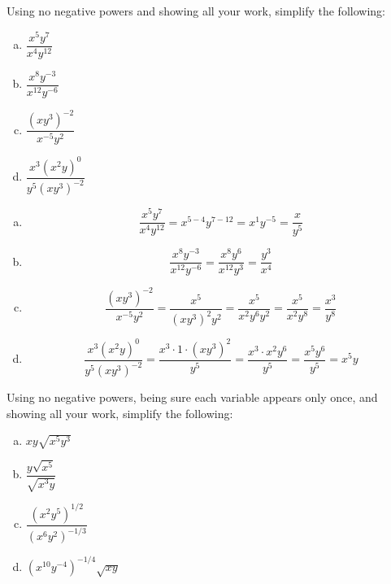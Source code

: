 \documentclass[11pt,letterpaper]{article}
\begin{document}
\newpage



 Using no negative powers and showing all your work, simplify the following:
        \begin{enumerate}[(a)]
        \item $\dfrac{x^5 y^7}{x^4 y^{12}}$
        \item $\dfrac{x^8 y^{-3}}{x^{12} y^{-6}}$
        \item $\dfrac{(xy^3)^{-2}}{x^{-5} y^2}$
        \item $\dfrac{x^3 (x^2y)^0}{y^5(xy^3)^{-2}}$
        \end{enumerate} \pspace

\sol
\begin{enumerate}[(a)]
\item 
	\[
	\dfrac{x^5 y^7}{x^4 y^{12}}= x^{5 - 4} y^{7 - 12}= x^1 y^{-5}= \dfrac{x}{y^5}
	\] \pspace

\item 
	\[
	\dfrac{x^8 y^{-3}}{x^{12} y^{-6}}= \dfrac{x^8 y^6}{x^{12} y^3}= \dfrac{y^3}{x^4}
	\] \pspace

\item 
	\[
	\dfrac{(xy^3)^{-2}}{x^{-5} y^2}= \dfrac{x^5}{(x y^3)^2 y^2}= \dfrac{x^5}{x^2 y^6 y^2}= \dfrac{x^5}{x^2 y^8}= \dfrac{x^3}{y^8}
	\] \pspace

\item 
	\[
	\dfrac{x^3 (x^2y)^0}{y^5(xy^3)^{-2}}= \dfrac{x^3 \cdot 1 \cdot (xy^3)^2}{y^5}= \dfrac{x^3 \cdot x^2 y^6}{y^5}= \dfrac{x^5 y^6}{y^5}= x^5y
	\]
\end{enumerate}



\newpage



 Using no negative powers, being sure each variable appears only once, and showing all your work, simplify the following:
        \begin{enumerate}[(a)]
        \item $xy\sqrt{x^5y^3}$
        \item $\dfrac{y \sqrt{x^5}}{\sqrt{x^3y}}$
        \item $\dfrac{(x^2 y^5)^{1/2}}{(x^6 y^{2})^{-1/3}}$
        \item $(x^{10} y^{-4})^{-1/4} \sqrt{xy}$
        \end{enumerate} \pspace
\end{document}
